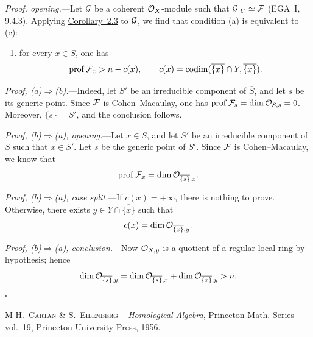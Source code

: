 
\medskip
\noindent\textit{Proof, opening.}---Let $\mathcal G$ be a coherent $\mathcal O_X$-module
such that $\cG|_U\simeq\cF$ (EGA~I, 9.4.3). Applying \hyperref[VIII.2.3]{Corollary~2.3} to
$\mathcal G$, we find that condition \textup{(a)} is equivalent to \textup{(c)}:
\begin{enumerate}
\item[(c)] for every $x\in S$, one has
\[
  \prof\cF_x>n-c(x),
  \qquad
  c(x)=\codimn(\overline{\{x\}}\cap Y,\overline{\{x\}}).
\]
\end{enumerate}


\medskip
\noindent\textit{Proof, \textup{(a)}$\Rightarrow$\textup{(b)}.}---Indeed,
let $S'$ be an irreducible component of $\overline S$, and let $s$ be its
generic point. Since $\cF$ is Cohen--Macaulay, one has
$\prof \cF_s=\dim\cO_{S,s}=0$. Moreover, $\overline{\{s\}}=S'$, and the
conclusion follows.


\medskip
\noindent\textit{Proof, \textup{(b)}$\Rightarrow$\textup{(a)}, opening.}---Let
$x\in S$, and let $S'$ be an irreducible component of $\overline S$ such that
$x\in S'$. Let $s$ be the generic point of $S'$. Since $\cF$ is
Cohen--Macaulay, we know that
\[
  \prof \cF_x=\dim\cO_{\overline{\{s\}},x}.
\]

\medskip
\noindent\textit{Proof, \textup{(b)}$\Rightarrow$\textup{(a)}, case
split.}---If $c(x)=+\infty$, there is nothing to prove. Otherwise, there exists
$y\in Y\cap\overline{\{x\}}$ such that
\[
  c(x)=\dim\mathcal O_{\overline{\{x\}},y}.
\]

\medskip
\noindent\textit{Proof, \textup{(b)}$\Rightarrow$\textup{(a)},
conclusion.}---Now $\mathcal O_{X,y}$ is a quotient of a regular local ring by
hypothesis; hence
\[
  \dim\mathcal O_{\overline{\{s\}},y}
  =\dim\mathcal O_{\overline{\{s\}},x}
   +\dim\mathcal O_{\overline{\{x\}},y}>n.
\]
\hfill$\square$


\begingroup

\renewcommand{\refname}{Bibliography}
\begin{thebibliography}{M}
\textsc{H.~Cartan \& S.~Eilenberg} -- \emph{Homological Algebra},
Princeton Math. Series vol.~19, Princeton University Press, 1956.
\end{thebibliography}
\endgroup
